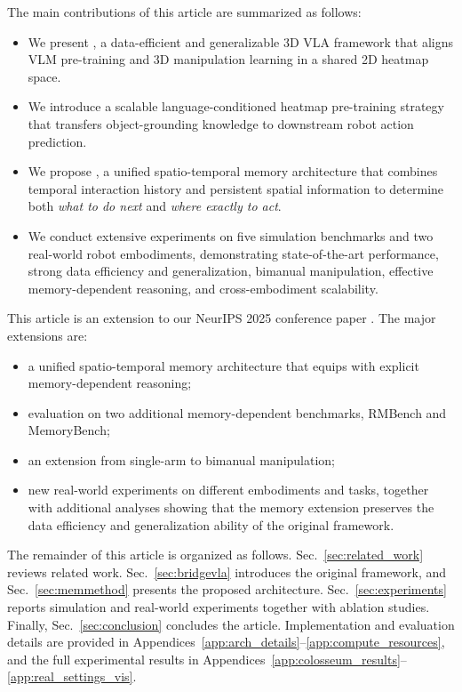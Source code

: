 The main contributions of this article are summarized as follows:
\begin{itemize}
  \item We present \method, a data-efficient and generalizable 3D VLA
  framework that aligns VLM pre-training and 3D manipulation learning in a
  shared  2D heatmap space.

  \item We introduce a scalable language-conditioned heatmap pre-training
  strategy that transfers object-grounding knowledge to downstream robot
  action prediction.

  \item We propose \memmethod, a unified spatio-temporal memory architecture
  that combines temporal interaction history and persistent spatial
  information to determine both \emph{what to do next} and
  \emph{where exactly to act}.

  \item We conduct extensive experiments on five simulation benchmarks and
  two real-world robot embodiments, demonstrating state-of-the-art
  performance, strong data efficiency and generalization, bimanual manipulation, effective
  memory-dependent reasoning, and
  cross-embodiment scalability.
\end{itemize}

This article is an extension to our NeurIPS 2025 conference paper
\cite{li2026bridgevla}.
The major extensions are:
\begin{itemize}
  \item a unified spatio-temporal memory architecture that equips
  \method with explicit memory-dependent reasoning;

  \item evaluation on two additional memory-dependent benchmarks,
  RMBench and MemoryBench;

  \item an extension from single-arm to bimanual manipulation;

  \item new real-world experiments on different embodiments and tasks, together with
  additional analyses showing that the memory extension preserves the data
  efficiency and generalization ability of the original framework.
\end{itemize}

The remainder of this article is organized as follows.
Sec.~\ref{sec:related_work} reviews related work.
Sec.~\ref{sec:bridgevla} introduces the original \method framework,
and Sec.~\ref{sec:memmethod} presents the proposed \memmethod
architecture.
Sec.~\ref{sec:experiments} reports simulation and real-world
experiments together with ablation studies.
Finally, Sec.~\ref{sec:conclusion} concludes the article.
Implementation and evaluation details are provided in
Appendices~\ref{app:arch_details}--\ref{app:compute_resources}, and the
full experimental results in
Appendices~\ref{app:colosseum_results}--\ref{app:real_settings_vis}.